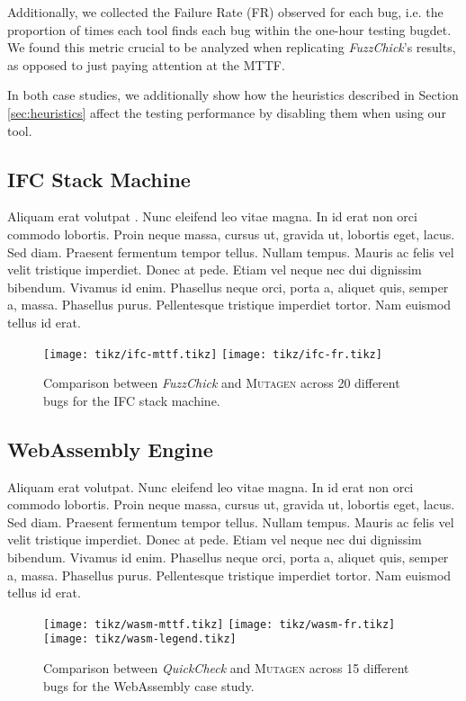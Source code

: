 \documentclass[acmsmall, anonymous]{acmart}
\newcommand{\quickcheck}{\textit{QuickCheck}\xspace}
\newcommand{\fuzzchick}{\textit{FuzzChick}\xspace}
\newcommand{\mutagen}{\textsc{Mutagen}\xspace}
\begin{document}
Additionally, we collected the Failure Rate (FR) observed for each bug, i.e. the
proportion of times each tool finds each bug within the one-hour testing bugdet.
%
We found this metric crucial to be analyzed when replicating \fuzzchick's
results, as opposed to just paying attention at the MTTF.

In both case studies, we additionally show how the heuristics described in
Section \ref{sec:heuristics} affect the testing performance by disabling them
when using our tool.

\subsection{IFC Stack Machine}

Aliquam erat volutpat \citep{devai2013edsl}. Nunc eleifend leo vitae magna. In
id erat non orci commodo lobortis. Proin neque massa, cursus ut, gravida ut,
lobortis eget, lacus. Sed diam. Praesent fermentum tempor tellus. Nullam tempus.
Mauris ac felis vel velit tristique imperdiet. Donec at pede. Etiam vel neque
nec dui dignissim bibendum. Vivamus id enim. Phasellus neque orci, porta a,
aliquet quis, semper a, massa. Phasellus purus. Pellentesque tristique imperdiet
tortor. Nam euismod tellus id erat.

\begin{figure}
  \centering
  \texttt{[image: tikz/ifc-mttf.tikz]}
  \texttt{[image: tikz/ifc-fr.tikz]}
  \caption{\label{fig:results:ifc} Comparison between \fuzzchick and \mutagen
    across 20 different bugs for the IFC stack machine. }
\end{figure}

\subsection{WebAssembly Engine}

Aliquam erat volutpat. Nunc eleifend leo vitae magna. In id erat non orci
commodo lobortis. Proin neque massa, cursus ut, gravida ut, lobortis eget,
lacus. Sed diam. Praesent fermentum tempor tellus. Nullam tempus. Mauris ac
felis vel velit tristique imperdiet. Donec at pede. Etiam vel neque nec dui
dignissim bibendum. Vivamus id enim. Phasellus neque orci, porta a, aliquet
quis, semper a, massa. Phasellus purus. Pellentesque tristique imperdiet tortor.
Nam euismod tellus id erat.

\begin{figure}
  \centering
  \texttt{[image: tikz/wasm-mttf.tikz]}
  \texttt{[image: tikz/wasm-fr.tikz]}\vspace{-5pt}
  \texttt{[image: tikz/wasm-legend.tikz]}
  \caption{\label{fig:results:wasm} Comparison between \quickcheck and \mutagen
    across 15 different bugs for the WebAssembly case study. }
\end{figure}
\end{document}
